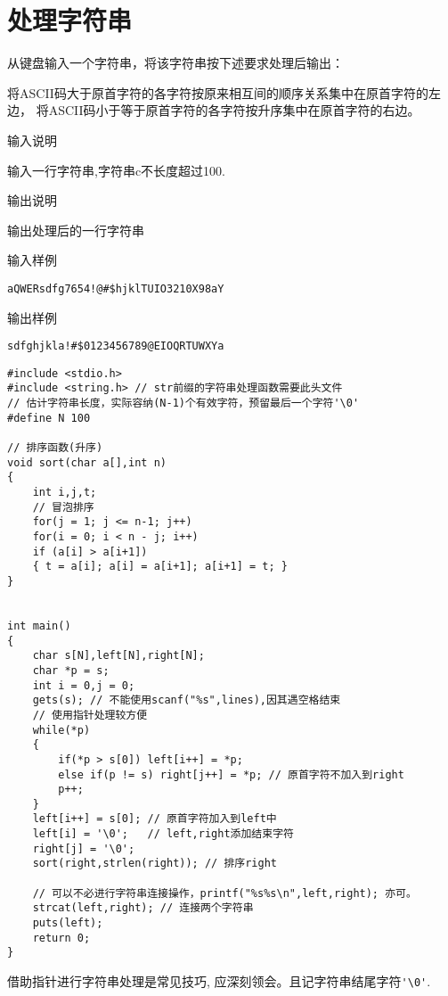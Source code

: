 \section{处理字符串}
从键盘输入一个字符串，将该字符串按下述要求处理后输出： 

将ASCII码大于原首字符的各字符按原来相互间的顺序关系集中在原首字符的左边，
将ASCII码小于等于原首字符的各字符按升序集中在原首字符的右边。

输入说明	

输入一行字符串,字符串c不长度超过100.

输出说明	

输出处理后的一行字符串

输入样例
	
\lstinline|aQWERsdfg7654!@#$hjklTUIO3210X98aY|

输出样例
	
\lstinline|sdfghjkla!#$0123456789@EIOQRTUWXYa|


\begin{lstlisting}
#include <stdio.h>
#include <string.h> // str前缀的字符串处理函数需要此头文件
// 估计字符串长度，实际容纳(N-1)个有效字符，预留最后一个字符'\0'  
#define N 100

// 排序函数(升序) 
void sort(char a[],int n)
{ 
	int i,j,t;
	// 冒泡排序
	for(j = 1; j <= n-1; j++) 
	for(i = 0; i < n - j; i++)
	if (a[i] > a[i+1]) 
	{ t = a[i]; a[i] = a[i+1]; a[i+1] = t; }
}


int main()
{
	char s[N],left[N],right[N];
	char *p = s;
	int i = 0,j = 0;
	gets(s); // 不能使用scanf("%s",lines),因其遇空格结束
	// 使用指针处理较方便 
	while(*p)
	{
		if(*p > s[0]) left[i++] = *p;
		else if(p != s) right[j++] = *p; // 原首字符不加入到right 
		p++; 
	}
	left[i++] = s[0]; // 原首字符加入到left中 
	left[i] = '\0';   // left,right添加结束字符 
	right[j] = '\0';
	sort(right,strlen(right)); // 排序right 
	
	// 可以不必进行字符串连接操作，printf("%s%s\n",left,right); 亦可。
	strcat(left,right); // 连接两个字符串 
	puts(left);
	return 0;
} 
\end{lstlisting}

\begin{note}[要点]
	借助指针进行字符串处理是常见技巧, 应深刻领会。且记字符串结尾字符\lstinline|'\0'|.
\end{note}
